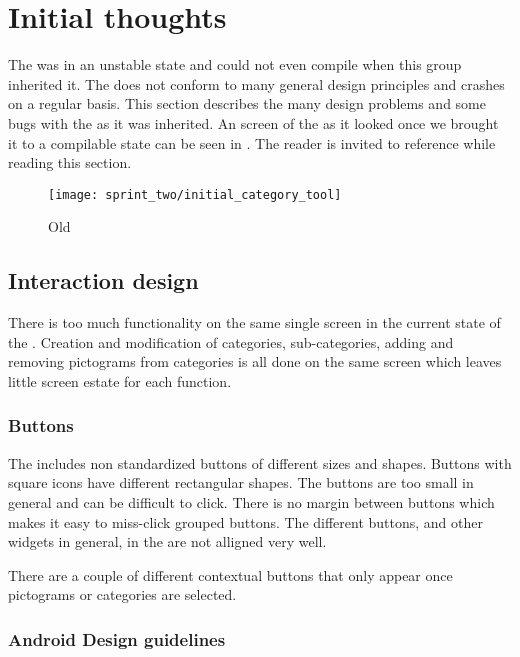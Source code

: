 \section{Initial thoughts}

The \ct was in an unstable state and could not even compile when this group inherited it. The \ct does not conform to many general design principles and crashes on a regular basis. This section describes the many design problems and some bugs with the \ct as it was inherited. An screen of the \ct as it looked once we brought it to a compilable state can be seen in . The reader is invited to reference  while reading this section.

\begin{figure}[!htbp]
    \centering
    \texttt{[image: sprint\_two/initial\_category\_tool]}
    \caption{Old \ct}
    \label{fig:category_tool_old}
\end{figure}

\subsection{Interaction design}

There is too much functionality on the same single screen in the current state of the \ct. Creation and modification of categories, sub-categories, adding and removing pictograms from categories is all done on the same screen which leaves little screen estate for each function.  

\subsubsection{Buttons}

The \ct includes non standardized buttons of different sizes and shapes. Buttons with square icons have different rectangular shapes. The buttons are too small in general and can be difficult to click. There is no margin between buttons which makes it easy to miss-click grouped buttons.   
The different buttons, and other widgets in general, in the \ct are not alligned very well.

There are a couple of different contextual buttons that only appear once pictograms or categories are selected. 

\subsubsection{Android Design guidelines}

